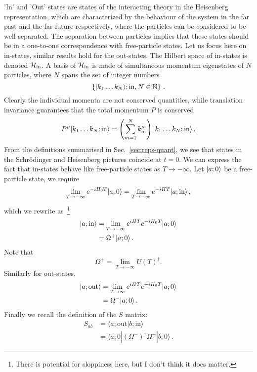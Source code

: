 'In' and 'Out' states are states of the interacting theory in the Heisenberg
representation, which are characterized by the behaviour of the system in the
far past and the far future respectively, where the particles can be considered
to be well separated. The separation between particles implies that these states
should be in a one-to-one correspondence with free-particle states. Let us focus
here on in-states, similar results hold for the out-states. The Hilbert space of
in-states is denoted $\mathcal{H}_{\mathrm{in}}$. A basis of $\mathcal{H}_{\mathrm{in}}$ is made of simultaneous momentum
eigenstates of $N$ particles, where $N$ spans the set of integer numbers
\begin{equation}
    \label{eq:HinBasis}
    \left\{ | k_1 \ldots k_N \rangle; \mathrm{in}, N \in \mathbb{N} \right\}\, .
\end{equation}
Clearly the individual momenta are not conserved quantities, while translation
invariance guarantees that the total momentum $P$ is conserved
\begin{equation}
    \label{eq:TotMomConserv}
    P^\mu | k_1 \ldots k_N; \mathrm{in} \rangle = 
    \left(\sum_{m=1}^N k^\mu_m\right) 
    | k_1 \ldots k_N; \mathrm{in} \rangle\, .
\end{equation}
From the definitions summarised in Sec.~\ref{sec:reps-quant}, we see that states
in the Schr\"odinger and Heisenberg pictures coincide at $t=0$. We can express
the fact that in-states behave like free-particle states as $T \to -\infty$. Let
$| a; 0 \rangle$ be a free-particle state, we require
\begin{equation}
    \label{eq:InAsympOne}
    \lim_{T\to-\infty} e^{-i H_0 T} | a;0 \rangle =
    \lim_{T\to-\infty} e^{-i H T} | a; \mathrm{in} \rangle\, ,
\end{equation}
which we rewrite as~\footnote{There is potential for sloppiness here, but I
don't think it does matter.}
\begin{align}
    \label{eq:InAsympTwo}
    | a; \mathrm{in} \rangle &= \lim_{T\to-\infty} e^{i H T} e^{-i H_0 T} | a;0 \rangle
    \\
    \label{eq:MollerOne}
    &= \Omega^+ | a; 0 \rangle\, .
\end{align}
Note that 
\begin{equation}
    \label{eq:MollerComment}
    \Omega^+ = \lim_{T\to-\infty} U(T)^\dagger.
\end{equation}
Similarly for out-states,
\begin{align}
    \label{eq:OutAsympTwo}
    | a; \mathrm{out} \rangle &= \lim_{T\to\infty} e^{i H T} e^{-i H_0 T} | a;0 \rangle
    \\
    \label{eq:MollerTwo}
    &= \Omega^- | a; 0 \rangle\, .
\end{align}
Finally we recall the definition of the $S$ matrix: 
\begin{align}
    \label{eq:SMatOne}
    S_{ab} &= \langle a; \mathrm{out} | b; \mathrm{in} \rangle \\
    \label{eq:SMatTwo}
    &= \langle a; 0 | \left(\Omega^-\right)^\dagger
    \Omega^+ | b; 0\rangle\, .
\end{align}


